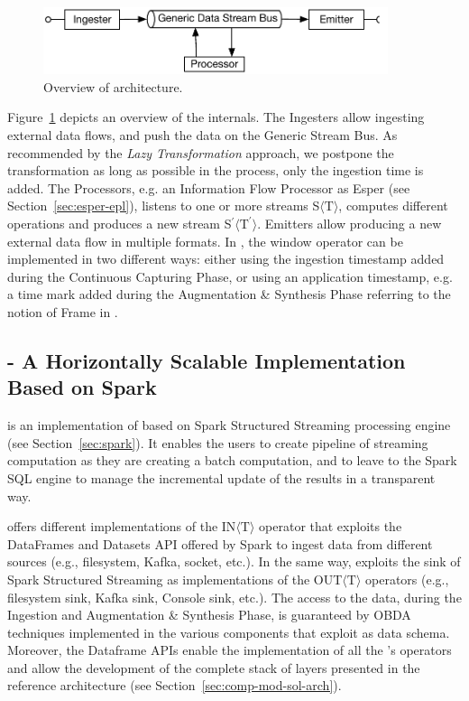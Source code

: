 \begin{figure}[t]
\centering
\includegraphics[width=0.9\textwidth]{img/comp-mod-natron-schema}
\caption{Overview of \sti{} architecture.}
\label{fig:sti}
\end{figure} 

Figure~\ref{fig:sti} depicts an overview of the \sti{} internals.
The Ingesters allow ingesting external data flows, and push the data on the Generic Stream Bus.
As recommended by the \textit{Lazy Transformation} approach, we postpone the transformation as long as possible in the process, only the ingestion time is added. 
The Processors, e.g. an Information Flow Processor as Esper (see Section~\ref{sec:esper-epl}), listens to one or more streams S$\langle\mathrm{T}\rangle$, computes different operations and produces a new stream S$^{\prime}\langle\mathrm{T^{\prime}}\rangle$. 
Emitters allow \sti{} producing a new external data flow in multiple formats. 
In \sti{}, the window operator can be implemented in two different ways: either using the ingestion timestamp added during the Continuous Capturing Phase, or using an application timestamp, e.g. a time mark added during the Augmentation \& Synthesis Phase referring to the notion of Frame in \frappe{}.

\subsection{\protect\sparkdi{} - A Horizontally Scalable Implementation Based on Spark} \label{sec:comp-mod-impl-h-spark}

\sparkdi{} is an implementation of \river{} based on Spark Structured Streaming processing engine (see Section~\ref{sec:spark}). 
It enables the users to create pipeline of streaming computation as they are creating a batch computation, and to leave to the Spark SQL engine to manage the incremental update of the results in a transparent way.

\sparkdi{} offers different implementations of the IN$\langle\mathrm{T}\rangle$ operator that exploits the DataFrames and Datasets API offered by Spark to ingest data from different sources (e.g., filesystem, Kafka, socket, etc.).
In the same way, \sparkdi{} exploits the sink of Spark Structured Streaming as implementations of the OUT$\langle\mathrm{T}\rangle$ operators (e.g., filesystem sink, Kafka sink, Console sink, etc.).
The access to the data, during the Ingestion and Augmentation \& Synthesis Phase,  is guaranteed by OBDA techniques implemented in the various components that exploit \frappe{} as data schema.
Moreover, the Dataframe APIs enable the implementation of all the \river{}'s operators and allow the development of the complete stack of layers presented in the \river{} reference architecture (see Section~\ref{sec:comp-mod-sol-arch}).

